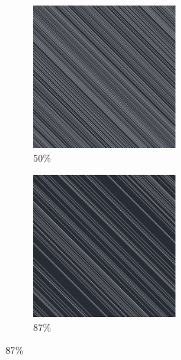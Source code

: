\documentclass[12pt, fleqn]{report}                             %
\theoremstyle{break}                                            %
\begin{document}
\begin{figure}[ht!]
\begin{subfigure}[b]{0.4\linewidth}
          \includegraphics[width=0.6\textwidth]{Images/24/c.png}
          \caption{50\%}
        \end{subfigure}
        \begin{subfigure}[b]{0.4\linewidth}
          \includegraphics[width=0.6\textwidth]{Images/24/d.png}
          \caption{87\%}
        \end{subfigure}
      \end{figure}
\end{document}
